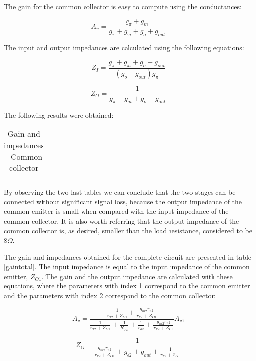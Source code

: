 The gain for the common collector is easy to compute using the conductances:

\begin{equation}
        A_v = \frac{g_{\pi}+g_m}{g_{\pi}+g_m+g_o+g_{out}}
\end{equation}

The input and output impedances are calculated using the following equations:

\begin{equation}
        Z_I = \frac{g_{\pi}+g_m+g_o+g_{out}}{(g_o+g_{out})g_{\pi}}
\end{equation}

\begin{equation}
        Z_O = \frac{1}{g_{\pi}+g_m+g_o+g_{out}}
\end{equation}

The following results were obtained:

\begin{table}[H]
  \centering
  \begin{tabular}{|c|c|}
    \hline
        
        \hline
  \end{tabular}
  \caption{Gain and impedances - Common collector}
  \label{gaincollector}
\end{table}

By observing the two last tables we can conclude that the two stages can be connected without significant signal loss, because the output impedance of the common emitter is small when compared with the input impedance of the common collector. It is also worth referring that the output impedance of the common collector is, as desired, smaller than the load resistance, considered to be $8\Omega$.

The gain and impedances obtained for the complete circuit are presented in table \ref{gaintotal}. The input impedance is equal to the input impedance of the common emitter, $Z_{O1}$. The gain and the output impedance are calculated with these equations, where the parameters with index 1 correspond to the common emitter and the parameters with index 2 correspond to the common collector:

\begin{equation}
        A_v = \frac{\frac{1}{r_{\pi2}+Z_{O1}}+\frac{g_{m2}r_{\pi2}}{r_{\pi2}+Z_{O1}}}{\frac{1}{r_{\pi2}+Z_{O1}}+\frac{1}{R_{out}}+\frac{1}{r_{o2}}+\frac{g_{m2}r_{\pi2}}{r_{\pi2}+Z_{O1}}} A_{v1}
\end{equation}

\begin{equation}
        Z_O = \frac{1}{\frac{g_{m2}r_{\pi2}}{r_{\pi2}+Z_{O1}}+g_{o2}+g_{out}+\frac{1}{r_{\pi2}+Z_{O1}}}
\end{equation}

